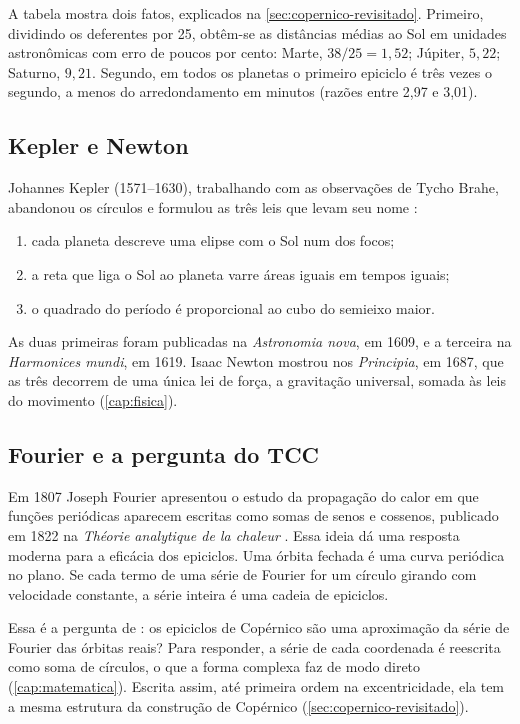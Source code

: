 A tabela mostra dois fatos, explicados na \autoref{sec:copernico-revisitado}. Primeiro, dividindo os deferentes por 25, obtêm-se as distâncias médias ao Sol em unidades astronômicas com erro de poucos por cento: Marte, $38/25 = 1{,}52$; Júpiter, $5{,}22$; Saturno, $9{,}21$. Segundo, em todos os planetas o primeiro epiciclo é três vezes o segundo, a menos do arredondamento em minutos (razões entre 2,97 e 3,01).

\subsection{Kepler e Newton}

Johannes Kepler (1571--1630), trabalhando com as observações de Tycho Brahe, abandonou os círculos e formulou as três leis que levam seu nome \cite{kuhn2002}:

\begin{enumerate}
  \item cada planeta descreve uma elipse com o Sol num dos focos;
  \item a reta que liga o Sol ao planeta varre áreas iguais em tempos iguais;
  \item o quadrado do período é proporcional ao cubo do semieixo maior.
\end{enumerate}

As duas primeiras foram publicadas na \emph{Astronomia nova}, em 1609, e a terceira na \emph{Harmonices mundi}, em 1619. Isaac Newton mostrou nos \emph{Principia}, em 1687, que as três decorrem de uma única lei de força, a gravitação universal, somada às leis do movimento (\autoref{cap:fisica}).

\subsection{Fourier e a pergunta do TCC}

Em 1807 Joseph Fourier apresentou o estudo da propagação do calor em que funções periódicas aparecem escritas como somas de senos e cossenos, publicado em 1822 na \emph{Théorie analytique de la chaleur} \cite{pifer2015}. Essa ideia dá uma resposta moderna para a eficácia dos epiciclos. Uma órbita fechada é uma curva periódica no plano. Se cada termo de uma série de Fourier for um círculo girando com velocidade constante, a série inteira é uma cadeia de epiciclos.

Essa é a pergunta de : os epiciclos de Copérnico são uma aproximação da série de Fourier das órbitas reais? Para responder, a série de cada coordenada é reescrita como soma de círculos, o que a forma complexa faz de modo direto (\autoref{cap:matematica}). Escrita assim, até primeira ordem na excentricidade, ela tem a mesma estrutura da construção de Copérnico (\autoref{sec:copernico-revisitado}).
